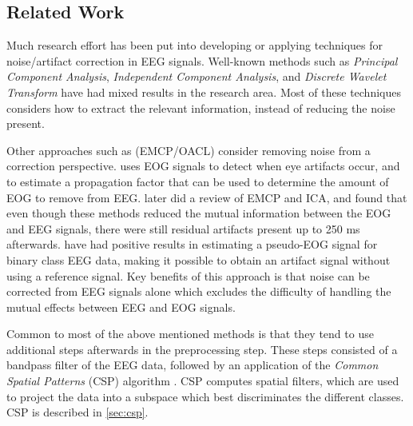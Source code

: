\subsection{Related Work}
Much research effort has been put into developing or applying techniques for noise/artifact correction in EEG signals. Well-known methods such as \emph{Principal Component Analysis}, \emph{Independent Component Analysis}, and \emph{Discrete Wavelet Transform} have had mixed results in the research area. Most of these techniques considers how to extract the relevant information, instead of reducing the noise present.

Other approaches such as (EMCP/OACL) consider removing noise from a correction perspective. \cite{gratton1983new} uses EOG signals to detect when eye artifacts occur, and to estimate a propagation factor that can be used to determine the amount of EOG to remove from EEG. \cite{hoffmann2008correction} later did a review of EMCP and ICA, and found that even though these methods reduced the mutual information between the EOG and EEG signals, there were still residual artifacts present up to 250 ms afterwards. \cite{li2015ocular} have had positive results in estimating a pseudo-EOG signal for binary class EEG data, making it possible to obtain an artifact signal without using a reference signal. Key benefits of this approach is that noise can be corrected from EEG signals alone which excludes the difficulty of handling the mutual effects between EEG and EOG signals.

Common to most of the above mentioned methods is that they tend to use additional steps afterwards in the preprocessing step. These steps consisted of a bandpass filter of the EEG data, followed by an application of the \emph{Common Spatial Patterns} (CSP) algorithm \citep{ramoser2000optimal}. CSP computes spatial filters, which are used to project the data into a subspace which best discriminates the different classes. CSP is described in \cref{sec:csp}.
